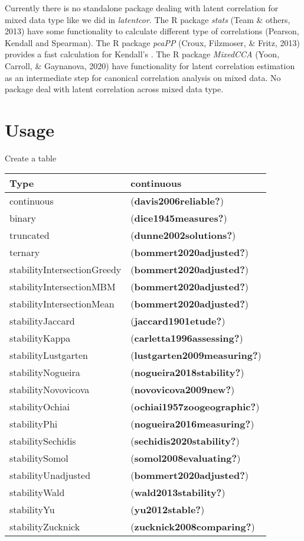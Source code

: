 \documentclass[10pt,a4paper,onecolumn]{article}
\begin{document}
Currently there is no standalone package dealing with latent correlation
for mixed data type like we did in \emph{latentcor}. The R package
\emph{stats} (Team \& others, 2013) have some functionality to calculate
different type of correlations (Pearson, Kendall and Spearman). The R
package \emph{pcaPP} (Croux, Filzmoser, \& Fritz, 2013) provides a fast
calculation for Kendall's \tau. The R package \emph{MixedCCA} (Yoon,
Carroll, \& Gaynanova, 2020) have functionality for latent correlation
estimation as an intermediate step for canonical correlation analysis on
mixed data. No package deal with latent correlation across mixed data
type.

\hypertarget{usage}{%
\section{Usage}\label{usage}}

Create a table

\begin{longtable}[]{@{}ll@{}}
\toprule
Type & continuous \\
\midrule
\endhead
continuous & (\textbf{davis2006reliable?}) \\
binary & (\textbf{dice1945measures?}) \\
truncated & (\textbf{dunne2002solutions?}) \\
ternary & (\textbf{bommert2020adjusted?}) \\
stabilityIntersectionGreedy & (\textbf{bommert2020adjusted?}) \\
stabilityIntersectionMBM & (\textbf{bommert2020adjusted?}) \\
stabilityIntersectionMean & (\textbf{bommert2020adjusted?}) \\
stabilityJaccard & (\textbf{jaccard1901etude?}) \\
stabilityKappa & (\textbf{carletta1996assessing?}) \\
stabilityLustgarten & (\textbf{lustgarten2009measuring?}) \\
stabilityNogueira & (\textbf{nogueira2018stability?}) \\
stabilityNovovicova & (\textbf{novovicova2009new?}) \\
stabilityOchiai & (\textbf{ochiai1957zoogeographic?}) \\
stabilityPhi & (\textbf{nogueira2016measuring?}) \\
stabilitySechidis & (\textbf{sechidis2020stability?}) \\
stabilitySomol & (\textbf{somol2008evaluating?}) \\
stabilityUnadjusted & (\textbf{bommert2020adjusted?}) \\
stabilityWald & (\textbf{wald2013stability?}) \\
stabilityYu & (\textbf{yu2012stable?}) \\
stabilityZucknick & (\textbf{zucknick2008comparing?}) \\
\bottomrule
\end{longtable}
\end{document}
